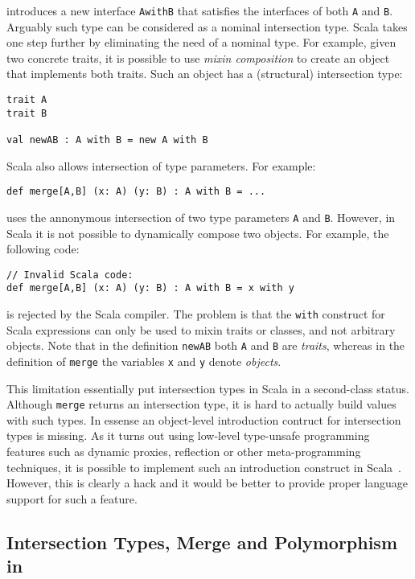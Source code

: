 \noindent introduces a new interface \lstinline{AwithB} that satisfies the interfaces of
both \lstinline{A} and \lstinline{B}. Arguably such type can be considered as a nominal
intersection type. Scala takes one step further by eliminating the
need of a nominal type. For example, given two concrete traits, it is possible to
use \emph{mixin composition} to create an object that implements both
traits. Such an object has a (structural) intersection type:

\begin{lstlisting}
trait A
trait B

val newAB : A with B = new A with B
\end{lstlisting}

\noindent Scala also allows intersection of type parameters. For example:
\begin{lstlisting}
def merge[A,B] (x: A) (y: B) : A with B = ...
\end{lstlisting}
uses the annonymous intersection of two type parameters \lstinline{A} and
\lstinline{B}. However, in Scala it is not possible to dynamically
compose two objects. For example, the following code:

\begin{lstlisting}
// Invalid Scala code:
def merge[A,B] (x: A) (y: B) : A with B = x with y
\end{lstlisting}

\noindent is rejected by the Scala compiler. The problem is that the
\lstinline{with} construct for Scala expressions can only be used to
mixin traits or classes, and not arbitrary objects. Note that in the
definition \lstinline{newAB} both \lstinline{A} and \lstinline{B} are
\emph{traits}, whereas in the definition of \lstinline{merge} the variables
\lstinline{x} and \lstinline{y} denote \emph{objects}.

This limitation essentially put intersection types in Scala in a second-class
status. Although \lstinline{merge} returns an intersection type, it is
hard to actually build values with such types. In essense an
object-level introduction contruct for intersection types is missing.
As it turns out using low-level type-unsafe programming features such
as dynamic proxies, reflection or other meta-programming techniques,
it is possible to implement such an introduction
construct in Scala~\cite{oliveira2013feature,rendel14attributes}. However, this
is clearly a hack and it would be better to provide proper language
support for such a feature.

\subsection{Intersection Types, Merge and Polymorphism in \name}

